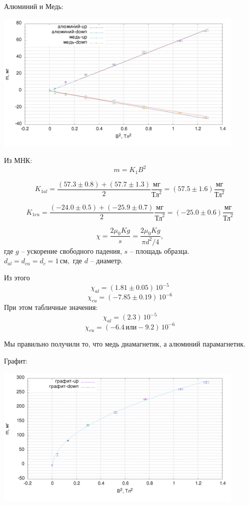 \newpage
Алюминий и Медь:
\begin{center}
\includegraphics[width=0.90\textwidth]{al-cu.png}
\end{center}

Из МНК:
$$m = K_1 B^2$$

$$K_{1al} = \frac{(57.3\pm0.8) + (57.7\pm1.3)}{2}\frac{\text{мг}}{\text{Тл}^2}=(57.5\pm1.6)\frac{\text{мг}}{\text{Тл}^2}$$

$$K_{1cu} = \frac{(-24.0\pm0.5) + (-25.9\pm0.7)}{2}\frac{\text{мг}}{\text{Тл}^2}=(-25.0\pm0.6)\frac{\text{мг}}{\text{Тл}^2}$$

$$\chi = \frac{2 \mu_0 K g} {s} = \frac{2 \mu_0 K g} {\pi d^2/4} ,$$
где $g$ -- ускорение свободного падения, $s$ -- площадь образца. $d_{al}=d_{cu}=d_{c}=1\,\text{см},$ где $d$ -- диаметр.

Из этого
$$\chi_{al} = (1.81\pm0.05)\,10^{-5}$$
$$\chi_{cu} = (-7.85\pm0.19)\,10^{-6}$$
При этом табличные значения:
$$\chi_{al} = (2.3)\,10^{-5}$$
$$\chi_{cu} = (-6.4\,\text{или}-9.2)\,10^{-6}$$

Мы правильно получили то, что медь диамагнетик, а алюминий парамагнетик. 

\newpage

Графит:
\begin{center}
\includegraphics[width=0.90\textwidth]{c.png}
\end{center}

